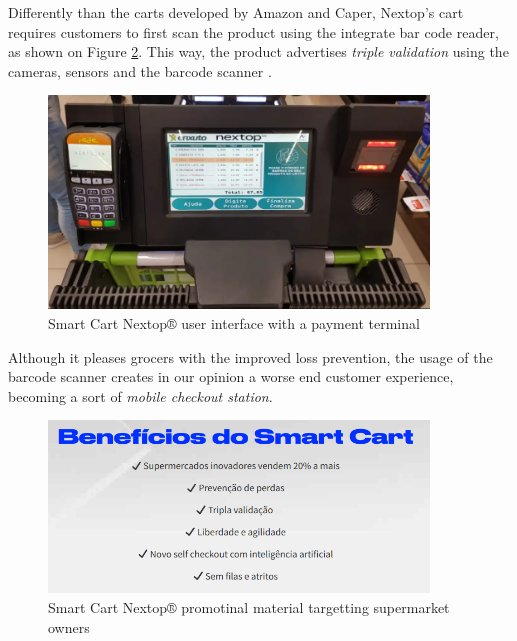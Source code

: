 \documentclass[openright]{normas-utf-tex} %
\begin{document}
Differently than the carts developed by Amazon and Caper, Nextop's cart
requires customers to first scan the product using the integrate bar code
reader, as shown on Figure \ref{fig:nextopui}. This way, the product advertises
\textit{triple validation} using the cameras, sensors and the barcode scanner \cite{Nextop2022}.

\begin{figure}[H]
	\centering
	\includegraphics[width=0.9\textwidth]{./images/nextop2.png}
    \caption[Smart Cart Nextop® user interface with a payment terminal]{Smart Cart Nextop® user interface with a payment terminal}
	\label{fig:nextopui}
\end{figure}

Although it pleases grocers with the improved loss prevention, the usage of the barcode scanner creates in our opinion a worse
end customer experience, becoming a sort of \textit{mobile checkout station}.

\begin{figure}[H]
	\centering
	\includegraphics[width=0.9\textwidth]{./images/nextoppromo.png}
    \caption[Smart Cart Nextop® promotinal material targetting supermarket owners]{Smart Cart Nextop® promotinal material targetting supermarket owners}
	\label{fig:nextopui}
\end{figure}
\end{document}
